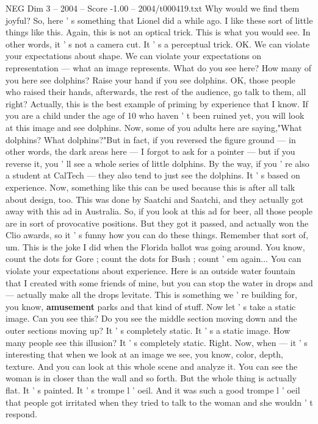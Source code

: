 \begin{textsample}{NEG Dim 3 – 2004 – Score -1.00 – 2004/t000419.txt}
Why would we find them joyful?
So, here ' s something that Lionel did a while ago.
I like these sort of little things like this.
Again, this is not an optical trick.
This is what you would see.
In other words, it ' s not a camera cut.
It ' s a perceptual trick.
OK.
We can violate your expectations about shape.
We can violate your expectations on representation — what an image represents.
What do you see here?
How many of you here see dolphins?
Raise your hand if you see dolphins.
OK, those people who raised their hands, afterwards, the rest of the audience, go talk to them, all right?
Actually, this is the best example of priming by experience that I know.
If you are a child under the age of 10 who haven ' t been ruined yet, you will look at this image and see dolphins.
Now, some of you adults here are saying,"What dolphins?
What dolphins?"But in fact, if you reversed the figure ground — in other words, the dark areas here — I forgot to ask for a pointer — but if you reverse it, you ' ll see a whole series of little dolphins.
By the way, if you ' re also a student at CalTech — they also tend to just see the dolphins.
It ' s based on experience.
Now, something like this can be used because this is after all talk about design, too.
This was done by Saatchi and Saatchi, and they actually got away with this ad in Australia.
So, if you look at this ad for beer, all those people are in sort of provocative positions.
But they got it passed, and actually won the Clio awards, so it ' s funny how you can do these things.
Remember that sort of, um.
This is the joke I did when the Florida ballot was going around.
You know, count the dots for Gore ; count the dots for Bush ; count ' em again...
You can violate your expectations about experience.
Here is an outside water fountain that I created with some friends of mine, but you can stop the water in drops and — actually make all the drops levitate.
This is something we ' re building for, you know, \textbf{amusement} parks and that kind of stuff.
Now let ' s take a static image.
Can you see this?
Do you see the middle section moving down and the outer sections moving up?
It ' s completely static.
It ' s a static image.
How many people see this illusion?
It ' s completely static.
Right.
Now, when — it ' s interesting that when we look at an image we see, you know, color, depth, texture.
And you can look at this whole scene and analyze it.
You can see the woman is in closer than the wall and so forth.
But the whole thing is actually flat.
It ' s painted.
It ' s trompe l ' oeil.
And it was such a good trompe l ' oeil that people got irritated when they tried to talk to the woman and she wouldn ' t respond.

\end{textsample}
